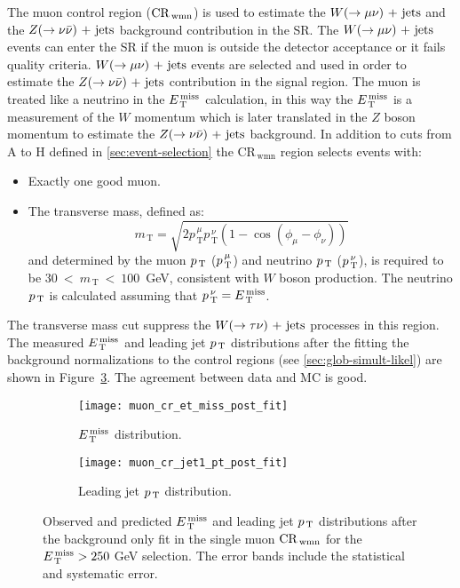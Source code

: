 The muon control region ($\mathrm{CR}_\mathrm{\, wmn}$) is used to estimate the $W (\rightarrow \mu \nu)\mathrm{~+~jets}$ and
the $Z (\rightarrow \nu \bar{\nu})\mathrm{~+~jets}$ background contribution in the SR\@. The $W (\rightarrow \mu \nu)\mathrm{~+~jets}$
events can enter the SR if the muon is outside the detector acceptance or it
fails quality criteria. $W (\rightarrow \mu \nu)\mathrm{~+~jets}$ events are selected and used in order
to estimate the $Z (\rightarrow \nu \bar{\nu})\mathrm{~+~jets}$ contribution in the signal region. The muon is
treated like a neutrino in the $E_\mathrm{\, T}^\mathrm{\, miss}$ calculation, in this way the $E_\mathrm{\, T}^\mathrm{\, miss}$ is a
measurement of the $W$ momentum which is later translated in the $Z$ boson
momentum to estimate the $Z (\rightarrow \nu \bar{\nu})\mathrm{~+~jets}$ background. In addition to cuts from A
to H defined in \cref{sec:event-selection} the CR$_{\mathrm{\, wmn}}$ region
selects events with:
\begin{itemize}
\item Exactly one good muon.
\item The transverse mass, defined as:
  \begin{equation}
    \label{eq:99}
    m_\mathrm{\, T} = \sqrt{2 p_\mathrm{\, T}^{\, \mu} p_\mathrm{\, T}^{\, \nu}
      (1 - \cos(\phi_\mu - \phi_\nu))}
  \end{equation}
  and determined by the muon $p_\mathrm{\, T}$ ($p_\mathrm{\, T}^{\, \mu}$) and neutrino $p_\mathrm{\, T}$
  ($p_\mathrm{\, T}^{\, \nu}$), is required to be $30~<~m_\mathrm{\, T}~<~100$~GeV,
  consistent with $W$ boson production. The neutrino $p_\mathrm{\, T}$ is calculated
  assuming that $p_\mathrm{\, T}^{\, \nu} = E_\mathrm{\, T}^\mathrm{\, miss}$.
\end{itemize}
The transverse mass cut suppress the $W (\rightarrow \tau \nu)\mathrm{~+~jets}$ processes in this
region. The measured $E_\mathrm{\, T}^\mathrm{\, miss}$ and leading jet $p_\mathrm{\, T}$ distributions after the
fitting the background normalizations to the control regions (see
\cref{sec:glob-simult-likel}) are shown in Figure~\ref{fig:muon_cr_plots}. The
agreement between data and MC is good.
\begin{figure}[!h]
  \centering
  \begin{subfigure}[t]{.48\linewidth}
    \texttt{[image: muon\_cr\_et\_miss\_post\_fit]}
    \caption{$E_\mathrm{\, T}^\mathrm{\, miss}$ distribution.}
    \label{fig:muon_cr_et_miss_pre_fit}
  \end{subfigure}
  \begin{subfigure}[t]{.48\linewidth}
    \texttt{[image: muon\_cr\_jet1\_pt\_post\_fit]}
    \caption{Leading jet $p_\mathrm{\, T}$ distribution.}
    \label{fig:muon_cr_jet1_pt_pre_fit}
  \end{subfigure}
  \caption{Observed and predicted $E_\mathrm{\, T}^\mathrm{\, miss}$ and leading jet $p_\mathrm{\, T}$ distributions
    after the background only fit in the single muon $\mathrm{CR}_\mathrm{\, wmn}$ for the
    $E_\mathrm{\, T}^\mathrm{\, miss} > 250~$GeV selection. The error bands include the statistical and
    systematic error.}
  \label{fig:muon_cr_plots}
\end{figure}

